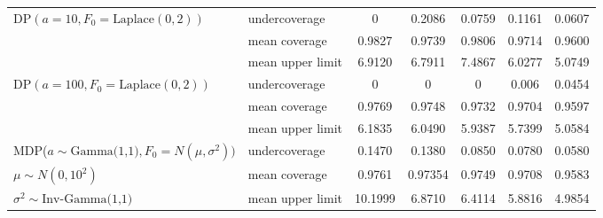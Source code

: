 \documentclass[11pt]{article}
\begin{document}
\begin{table}[htbp]
{\begin{tabular}{l l | c c c c c}
DP$(a=10,F_0=\text{Laplace}(0, 2))$
 & undercoverage  & 0 & 0.2086 & 0.0759 & 0.1161 & 0.0607 \\
 & mean coverage  & 0.9827 & 0.9739 & 0.9806 & 0.9714 & 0.9600 \\
 & mean upper limit & 6.9120 & 6.7911 & 7.4867 & 6.0277 & 5.0749 \\
DP$(a=100,F_0=\text{Laplace}(0,2))$
 & undercoverage  & 0 & 0 & 0 & 0.006 & 0.0454 \\
 & mean coverage  & 0.9769 & 0.9748 & 0.9732 & 0.9704 & 0.9597 \\
 & mean upper limit & 6.1835 & 6.0490 & 5.9387 & 5.7399 & 5.0584 \\
MDP($a\sim\text{Gamma(1,1)},F_0 = N(\mu,\sigma^2))$ & undercoverage  & 0.1470 & 0.1380 & 0.0850 & 0.0780 & 0.0580\\
 $\mu\sim N(0,10^2)$& mean coverage  & 0.9761 & 0.97354 & 0.9749 & 0.9708 & 0.9583 \\
 $\sigma^2\sim\text{Inv-Gamma(1,1)}$& mean upper limit & 10.1999 & 6.8710 & 6.4114 & 5.8816 & 4.9854 \\
 \hline
 \hline
\end{tabular}
}
\end{table}
\end{document}
